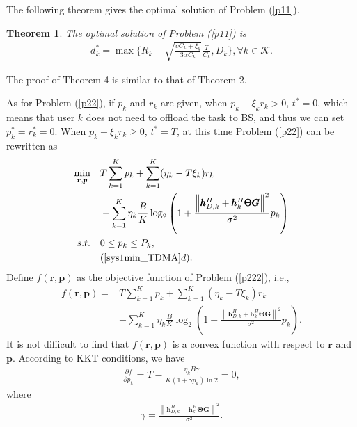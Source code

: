\documentclass[journal]{IEEEtran}
\newtheorem{theorem}{\bf Theorem}
\begin{document}
The following theorem gives the optimal solution of Problem (\ref{p11}).
\begin{theorem}
	The optimal solution of Problem (\ref{p11}) is
	\begin{align}
	d^*_k=\max \{R_k-\sqrt{\frac{\upsilon C_k+\xi_k}{3\alpha C_k}}\frac{T}{C_k}, D_k\}, \forall k\in \mathcal K.
	\end{align}
\end{theorem}
The proof of Theorem 4 is similar to that of Theorem 2.

As for Problem (\ref{p22}), if $p_k$ and $r_k$ are given, when $p_k-\xi_kr_k>0$, $t^*=0$, which means that user $k$ does not need to offload  the task to BS, and thus we can set $p^*_k=r^*_k=0$. When $p_k-\xi_kr_k\geq 0$, $t^*=T$, at this time  Problem (\ref{p22}) can be rewritten as
{\begin{subequations}\label{p222}
	\begin{align}
	\mathop{\min}_{\pmb r,\pmb p}\quad  &T\sum_{k=1}^K p_k+\sum_{k=1}^K(\eta_k-T\xi_k)r_k\\ \nonumber
	&-\sum_{k=1}^K\eta_k\frac{B}{K}\log_2\left( 1+ \frac{ \left\|\pmb h_{D,k}^H +\pmb h_{k}^H \pmb \Theta \pmb G \right\|^2}{\sigma^2}  {p_k} \right)\\
	s.t. \quad
	& 0 \leq p_k \leq P_k,\\
	& (\ref{sys1min_TDMA}d).
	\end{align}
\end{subequations}}
Define $f(\pmb r,\pmb p)$ as the objective function of Problem (\ref{p222}), i.e.,
{\begin{align}
f(\pmb r,\pmb p)=&T\sum_{k=1}^K p_k+\sum_{k=1}^K(\eta_k-T\xi_k)r_k\\ \nonumber &-\sum_{k=1}^K\eta_k\frac{B}{K}\log_2\left( 1+ \frac{ \left\|\pmb h_{D,k}^H +\pmb h_{k}^H \pmb \Theta \pmb G \right\|^2}{\sigma^2}  {p_k} \right).
\end{align}}
It is not difficult to find that $f(\pmb r,\pmb p)$ is a convex function with respect to $\pmb r$ and $\pmb p$. According to KKT conditions, we have
\begin{align}
\frac{\partial f}{\partial p_k}= T-	\frac{\eta_kB\gamma}{K(1+\gamma p_k)\ln 2}=0,
\end{align}
where
{\begin{align}
\gamma= \frac{\left\|\pmb h_{D,k}^H +\pmb h_{k}^H \pmb \Theta \pmb G \right\|^2}{\sigma^2}.
\end{align}}
\end{document}

